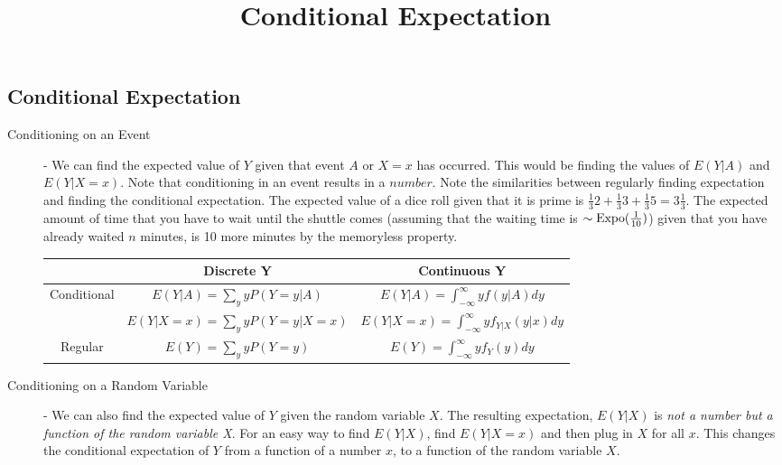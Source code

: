 \documentclass[11.5pt]{article}
\title{Conditional Expectation}
\author{\justin}
\begin{document}
\maketitle

\begin{notes}
\section*{Conditional Expectation}
\begin{description}
	\item[Conditioning on an Event] - We can find the expected value of $Y$ given that event $A$ or $X=x$ has occurred. This would be finding the values of $E(Y|A)$ and $E(Y|X = x)$. Note that conditioning in an event results in a $number$. Note the similarities between regularly finding expectation and finding the conditional expectation. The expected value of a dice roll given that it is prime is $\frac{1}{3}2 + \frac{1}{3}3 + \frac{1}{3}5 = 3\frac{1}{3}$. The expected amount of time that you have to wait until the shuttle comes (assuming that the waiting time is $\sim \textrm{Expo}(\frac{1}{10})$) given that you have already waited $n$ minutes, is 10 more minutes by the memoryless property.
		\begin{table}[htb!]
		   \centering
			\begin{tabular}{ccc}
			\toprule
				 ~& \textbf{Discrete Y} & \textbf{Continuous Y} \\
			\midrule
				 Conditional & $E(Y|A) = \sum_y yP(Y=y|A)$ & $E(Y|A) = \int_{-\infty}^\infty yf(y|A)dy$ \\ 
				 ~ & $E(Y|X=x) = \sum_y yP(Y=y|X=x)$ & $E(Y|X=x) =\int_{-\infty}^\infty yf_{Y|X}(y|x)dy$ \\
			\midrule
			Regular & $E(Y) = \sum_y yP(Y=y)$ & $E(Y) =\int_{-\infty}^\infty yf_Y(y)dy$ \\
			\bottomrule
			\end{tabular}
		\end{table}
	\vspace{-.45 cm}
	\item[Conditioning on a Random Variable] - We can also find the expected value of $Y$ given the random variable $X$. The resulting expectation, $E(Y|X)$ is \emph{not a number but a function of the random variable X}. For an easy way to find $E(Y|X)$, find $E(Y|X = x)$ and then plug in $X$ for all $x$. This changes the conditional expectation of $Y$ from a function of a number $x$, to a function of the random variable $X$.


\end{description}
\end{notes}
\end{document}
